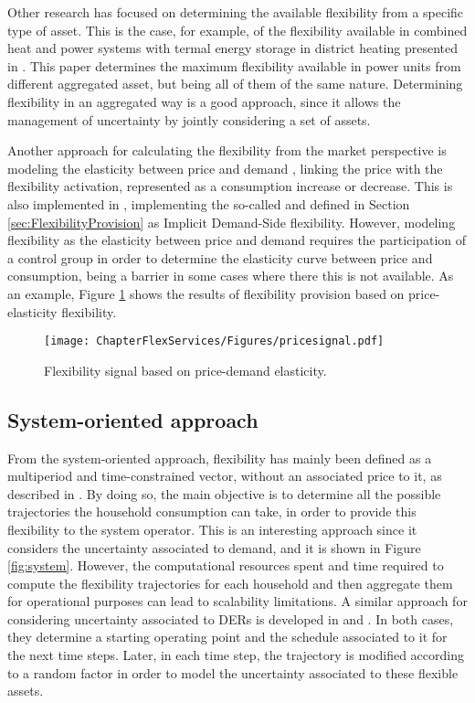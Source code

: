 
Other research has focused on determining the available flexibility from a specific type of asset. This is the case, for example, of the flexibility available in combined heat and power systems with termal energy storage in district heating presented in \cite{nuytten2013flexibility}. This paper determines the maximum flexibility available in power units from different aggregated asset, but being all of them of the same nature. Determining flexibility in an aggregated way is a good approach, since it allows the management of uncertainty by jointly considering a set of assets.  

Another approach for calculating the flexibility from the market perspective is modeling the elasticity between price and demand \cite{Gorria2013}, linking the price with the flexibility activation, represented as a consumption increase or decrease. This is also implemented in \cite{Moret2016}, implementing the so-called and defined in Section \ref{sec:FlexibilityProvision} as Implicit Demand-Side flexibility. However, modeling flexibility as the elasticity between price and demand requires the participation of a control group in order to determine the elasticity curve between price and consumption, being a barrier in some cases where there this is not available. As an example, Figure \ref{fig:elasticity} shows the results of flexibility provision based on price-elasticity flexibility. 

\begin{figure}[htbp]
	\centering
	\texttt{[image: ChapterFlexServices/Figures/pricesignal.pdf]}
		\caption{Flexibility signal based on price-demand elasticity.}
	\label{fig:elasticity}  
\end{figure}


\subsection{System-oriented approach}
From the system-oriented approach, flexibility has mainly been defined as a multiperiod and time-constrained vector, without an associated price to it, as described in \cite{Pinto2017}. By doing so, the main objective is to determine all the possible trajectories the household consumption can take, in order to provide this flexibility to the system operator. This is an interesting approach since it considers the uncertainty associated to demand, and it is shown in Figure \ref{fig:system}. However, the computational resources spent and time required to compute the flexibility trajectories for each household and then aggregate them for operational purposes can lead to scalability limitations. A similar approach for considering uncertainty associated to DERs is developed in \cite{Bremer2013} and \cite{SONNENSCHEIN2015}. In both cases, they determine a starting operating point and the schedule associated to it for the next time steps. Later, in each time step, the trajectory is modified according to a random factor in order to model the uncertainty associated to these flexible assets. 


